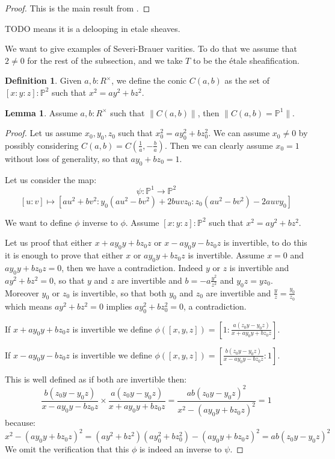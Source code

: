 \documentclass[10pt,a4paper]{article}
\theoremstyle{definition}
\newtheorem{lemma}[theorem]{Lemma}
\newtheorem{definition}[theorem]{Definition}
\newcommand{\propTrunc}[1]{\lVert #1 \rVert}
\newcommand{\bP}{\mathbb{P}}
\begin{document}
\begin{proof}
This is the main result from \cite{sag-projective}.
\end{proof}

TODO means it is a delooping in etale sheaves.

We want to give examples of Severi-Brauer varities. To do that we assume that $2\not=0$ for the rest of the subsection, and we take $T$ to be the étale sheafification.

\begin{definition}
Given $a,b:R^\times$, we define the conic $C(a,b)$ as the set of $[x:y:z]:\bP^2$ such that $x^2=ay^2+bz^2$.
\end{definition}

\begin{lemma}\label{pointed-conics-projective}
Assume $a,b:R^\times$ such that $\propTrunc{C(a,b)}$, then $\propTrunc{C(a,b)=\bP^1}$.
\end{lemma}

\begin{proof}
Let us assume $x_0,y_0,z_0$ such that $x_0^2 = ay_0^2+bz_0^2$. We can assume $x_0\not=0$ by possibly considering $C(a,b) = C(\frac{1}{a},-\frac{b}{a})$. Then we can clearly assume $x_0=1$ without loss of generality, so that $ay_0 + bz_0 = 1$.

 Let us consider the map:
\[\psi:\bP^1\to \bP^2\]
\[[u:v] \mapsto [au^2+bv^2: y_0(au^2-bv^2) + 2buvz_0 : z_0(au^2-bv^2) - 2auvy_0]\]

We want to define $\phi$ inverse to $\phi$. Assume $[x:y:z]:\bP^2$ such that $x^2=ay^2+bz^2$. 

Let us proof that either $x+ay_0y+bz_0z$ or $x-ay_0y-bz_0z$ is invertible, to do this it is enough to prove that either $x$ or $ay_0y+bz_0z$ is invertible. Assume $x=0$ and $ay_0y+bz_0z=0$, then we have a contradiction. Indeed $y$ or $z$ is invertible and $ay^2+bz^2=0$, so that $y$ and $z$ are invertible and $b = -a\frac{y^2}{z^2}$ and $y_0z=yz_0$. Moreover $y_0$ or $z_0$ is invertible, so that both $y_0$ and $z_0$ are invertible and $\frac{y}{z} = \frac{y_0}{z_0}$ which means $ay^2+bz^2=0$ implies $ay_0^2+bz_0^2=0$, a contradiction. 

If $x + ay_0y + bz_0z$ is invertible we define $\phi([x,y,z]) = [1:\frac{a(z_0y-y_0z)}{x + ay_0y + bz_0z}]$.

If $x - ay_0y - bz_0z$ is invertible we define $\phi([x,y,z]) = [\frac{b(z_0y-y_0z)}{x - ay_0y - bz_0z}:1]$.

This is well defined as if both are invertible then:
\[\frac{b(z_0y-y_0z)}{x - ay_0y - bz_0z}\times\frac{a(z_0y-y_0z)}{x + ay_0y + bz_0z} = \frac{ab(z_0y-y_0z)^2}{x^2 - (ay_0y + bz_0z)^2} = 1\]
because:
\[x^2 - (ay_0y + bz_0z)^2 = (ay^2+bz^2)(ay_0^2+bz_0^2) - (ay_0y + bz_0z)^2 = ab(z_0y-y_0z)^2\]
We omit the verification that this $\phi$ is indeed an inverse to $\psi$.
\end{proof}
\end{document}
